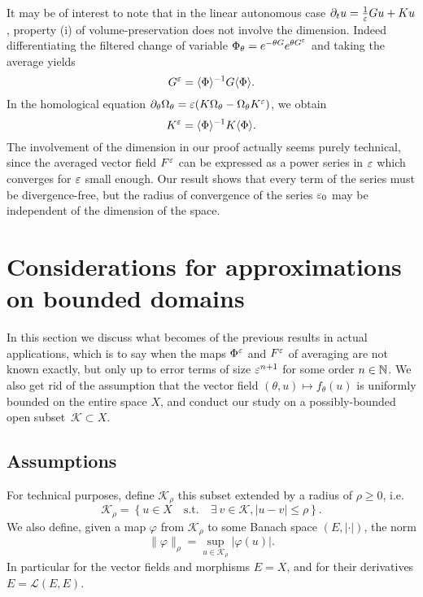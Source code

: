 \begin{remark}
  It may be of interest to note that in the linear autonomous case $\partial_t
  u = \frac{1}{\varepsilon} Gu + Ku$, property (i) of volume-preservation does
  not involve the dimension. Indeed differentiating the filtered change of
  variable $\Phi_\theta = e^{-\theta G} e^{\theta G^{\varepsilon}}$ and taking
  the average yields 
  \begin{equation*}
    G^{\varepsilon} = \langle \Phi \rangle^{-1} G \langle \Phi \rangle .
  \end{equation*}
  In the homological equation $\partial_\theta \Omega_\theta = \varepsilon (
  K \Omega_\theta - \Omega_\theta K^{\varepsilon} )$, we obtain 
  \begin{equation*}
    K^{\varepsilon} = \langle \Phi \rangle^{-1} K \langle \Phi \rangle .
  \end{equation*}
  The involvement of the dimension in our proof actually
  seems purely technical, since the averaged vector field $F^{\varepsilon}$ can be
  expressed as a power series in $\varepsilon$ which converges for $\varepsilon$ small
  enough. Our result shows that every term of the series must be
  divergence-free, but the radius of convergence of the series $\varepsilon_0$ may
  be independent of the dimension of the space.
\end{remark}




\section{Considerations for approximations on bounded domains}
\label{sec:approx}

In this section we discuss what becomes of the previous results in actual
applications, which is to say when the maps $\Phi^{\varepsilon}$ and $F^{\varepsilon}$ of
averaging are not known exactly, but only up to error terms of size
$\varepsilon^{n+1}$ for some order $n \in \mathbb{N}$. We also get rid of the assumption
that the vector field $(\theta , u) \mapsto f_\theta(u)$ is uniformly
bounded on the entire space $X$, and conduct our study on a
possibly-bounded open subset~$\mathcal{K} \subset X$. 

\subsection{Assumptions}

For technical purposes, define $\mathcal{K}_\rho$ this subset extended by
a radius of $\rho \geq 0$, i.e.
\begin{equation*}
  \mathcal{K}_\rho = \left\{u \in X \quad \text{s.t.}\quad 
                      \exists\ v \in \mathcal{K}, |u - v| \leq \rho 
                  \right\} .
\end{equation*}
We also define, given a map $\varphi$ from $\mathcal{K}_\rho$ to some
Banach space $(E, |\cdot|)$, the norm 
\begin{equation*}
  \| \varphi \|_\rho = \sup_{u \in \mathcal{K}_\rho} |\varphi(u) |.
\end{equation*}
In particular for the vector fields and morphisms $E = X$, and for their
derivatives $E = \mathcal{L}(E,E)$. 


